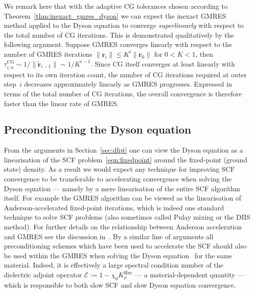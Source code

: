 \documentclass[hidelinks,onefignum,onetabnum]{siamart250211}
\newcommand{\KHxc}{K^{\mathrm{Hxc}}}
\newcommand{\taucg}{\tau^{\mathrm{CG}}}
\begin{document}
\begin{remark}\label{rmk:superlinear_convergence}
  We remark here that with the adaptive CG tolerances chosen
  according to Theorem~\ref{thm:inexact_gmres_dyson} we can expect
  the inexact GMRES method applied to the Dyson equation
  to converge \emph{superlinearly} with respect to the total number of CG iterations.
  This is demonstrated qualitatively by the following argument.
%
%
%
%
%
%
%
%
%
  Suppose GMRES converges linearly with respect to the number of 
  GMRES iterations $\|\bm r_i\| \leq K^i \|\bm r_0\|$ for $0<K<1$, 
  then $\taucg_{i,n} \sim 1/\|\widetilde{\bm r}_{i-1}\| \sim 1/K^{i-1}$.
  Since CG itself converges at least linearly with respect to its own iteration count,
  the number of CG iterations required at outer step~$i$ decreases approximately linearly as GMRES progresses.
  Expressed in terms of the total number of CG iterations, the overall convergence
  is therefore faster than the linear rate of GMRES.
\end{remark}

\subsection{Preconditioning the Dyson equation} \label{sec:kerker}

From the arguments in Section~\ref{sec:dfpt}
one can view the Dyson equation as a linearisation of the SCF problem~\eqref{eqn:fixedpoint}
around the fixed-point (ground state) density.
As a result we would expect any technique for improving SCF convergence
to be transferable to accelerating convergence when solving the Dyson equation
--- namely by a mere linearisation of the entire SCF algorithm itself.
For example the GMRES algorithm can be viewed as the linearisation
of Anderson-accelerated fixed-point iterations,
which is indeed one standard technique to solve SCF problems
(also sometimes called Pulay mixing or the DIIS method).
For further details on the relationship
between Anderson acceleration and GMRES
see the discussion in~\cite{Fang2009,Walker2011}.
By a similar line of arguments all preconditioning schemes
which have been used to accelerate the SCF should also be used
within the GMRES when solving the Dyson equation~\cite{Gerhorst2024}
for the same material.
Indeed, it is effectively a large spectral condition number
of the dielectric adjoint operator
$\mathcal{E} := 1 - \chi_0 \KHxc_\rho$
--- a material-dependent quantity ---
which is responsible to both slow SCF and slow Dyson equation convergence.
%
%
%
\end{document}
